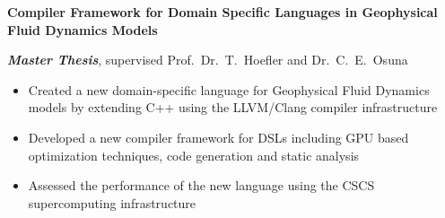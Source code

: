\textbf{Compiler Framework for Domain Specific Languages in Geophysical Fluid Dynamics Models}

\textbf{\textit{Master Thesis}}, supervised Prof.\ Dr.\ T.\ Hoefler and Dr.\ C.\ E.\ Osuna

\begin{itemize}
	\item Created a new domain-specific language for Geophysical Fluid Dynamics models by extending C++ using the LLVM/Clang compiler infrastructure
	\item Developed a new compiler framework for DSLs including GPU based optimization techniques, code generation and static analysis 
	\item Assessed the performance of the new language using the CSCS supercomputing infrastructure
\end{itemize}
